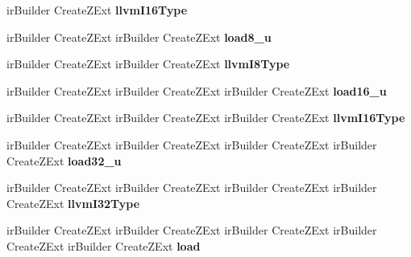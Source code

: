 \begin{DoxyCompactItemize}
ir\+Builder Create\+Z\+Ext {\bfseries llvm\+I16\+Type}
\item 
\mbox{\label{struct_l_l_v_m_j_i_t_1_1_emit_function_context_ab118a3eaaa8d3034b2ede88089933b72}} 
ir\+Builder Create\+Z\+Ext ir\+Builder Create\+Z\+Ext {\bfseries load8\+\_\+u}
\item 
\mbox{\label{struct_l_l_v_m_j_i_t_1_1_emit_function_context_adc1cdf0d2635dcee2ef2635b59a92862}} 
ir\+Builder Create\+Z\+Ext ir\+Builder Create\+Z\+Ext {\bfseries llvm\+I8\+Type}
\item 
\mbox{\label{struct_l_l_v_m_j_i_t_1_1_emit_function_context_a531e41aa33272106f30afa40ac819d1c}} 
ir\+Builder Create\+Z\+Ext ir\+Builder Create\+Z\+Ext ir\+Builder Create\+Z\+Ext {\bfseries load16\+\_\+u}
\item 
\mbox{\label{struct_l_l_v_m_j_i_t_1_1_emit_function_context_acac24f4af21068bda6e6e835967e8d22}} 
ir\+Builder Create\+Z\+Ext ir\+Builder Create\+Z\+Ext ir\+Builder Create\+Z\+Ext {\bfseries llvm\+I16\+Type}
\item 
\mbox{\label{struct_l_l_v_m_j_i_t_1_1_emit_function_context_ac6ae8febc1a1c503031218b1ac169f5e}} 
ir\+Builder Create\+Z\+Ext ir\+Builder Create\+Z\+Ext ir\+Builder Create\+Z\+Ext ir\+Builder Create\+Z\+Ext {\bfseries load32\+\_\+u}
\item 
\mbox{\label{struct_l_l_v_m_j_i_t_1_1_emit_function_context_aa8febff0547ef8d64046ba2950921f3b}} 
ir\+Builder Create\+Z\+Ext ir\+Builder Create\+Z\+Ext ir\+Builder Create\+Z\+Ext ir\+Builder Create\+Z\+Ext {\bfseries llvm\+I32\+Type}
\item 
\mbox{\label{struct_l_l_v_m_j_i_t_1_1_emit_function_context_a20bde4125c95edafc61d89e9c6d2a6b6}} 
ir\+Builder Create\+Z\+Ext ir\+Builder Create\+Z\+Ext ir\+Builder Create\+Z\+Ext ir\+Builder Create\+Z\+Ext ir\+Builder Create\+Z\+Ext {\bfseries load}
\item 
\mbox{\label{struct_l_l_v_m_j_i_t_1_1_emit_function_context_ac557dee95a678460d3ede521114567fd}} 

\end{DoxyCompactItemize}
